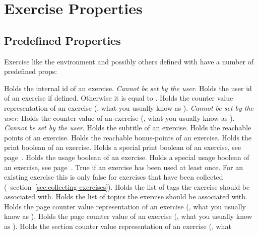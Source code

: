 \documentclass{xsim-manual}
\begin{document}
\section{Exercise Properties}\label{sec:exercise-properties}

\subsection{Predefined Properties}

Exercise like the  environment and possibly others defined with
 have a number of predefined \acsp*{prop}:
\begin{properties}
    Holds the internal id of an exercise.  \emph{Cannot be set by the user}.
    Holds the user id of an exercise if defined.  Otherwise it is equal to
    .
    Holds the counter value representation of an exercise (\ie, what you
    usually know as ).  \emph{Cannot be set by the
      user}.
    Holds the counter value of an exercise (\ie, what you usually know as
    ).  \emph{Cannot be set by the user}.
    Holds the subtitle of an exercise.
    Holds the reachable points of an exercise.
    Holds the reachable bonus-points of an exercise.
    Holds the print boolean of an exercise.
    Holds a special print boolean of an exercise, see
    page~\pageref{property:print!}.
    Holds the usage boolean of an exercise.
    Holds a special usage boolean of an exercise, see
    page~\pageref{property:print!}.
    True if an exercise has been used at least once.  For an existing exercise
    this is only false for exercises that have been collected
    (\cf~section~\vref{sec:collecting-exercises}).
    Holds the list of tags the exercise should be associated with.
    Holds the list of topics the exercise should be associated with.
    Holds the page counter value representation of an exercise (\ie, what you
    usually know as ).
    Holds the page counter value of an exercise (\ie, what you usually know as
    ).
    Holds the section counter value representation of an exercise (\ie, what

\end{properties}
\end{document}
